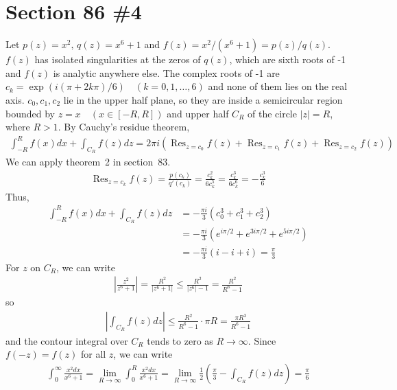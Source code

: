 \documentclass{scrartcl}
\DeclareMathOperator*{\Res}{Res}
\begin{document}
\section{Section 86 \#4}
Let \(p(z) = x^2,\, q(z) = x^6 + 1\) and \(f(z) = x^2 / (x^6 + 1) = p(z) / q(z)\).
\(f(z)\) has isolated singularities at the zeros of \(q(z)\), which are sixth roots of -1 and \(f(z)\) is analytic anywhere else.
The complex roots of -1 are \(c_k = \exp(i(\pi + 2k\pi) / 6) \quad (k = 0, 1, \dots, 6)\) and none of them lies on the real axis.
\(c_0, c_1, c_2\) lie in the upper half plane, so they are inside a semicircular region bounded by \(z = x \quad (x \in [-R, R])\) and upper half \(C_R\) of the circle \(|z| = R\), where \(R > 1\).
By Cauchy's residue theorem,
\begin{align*}
  \int^R_{-R} f(x) dx + \int_{C_R} f(z) dz
  = 2\pi i \left( \Res_{z = c_0} f(z) + \Res_{z = c_1} f(z) + \Res_{z = c_2} f(z) \right)
\end{align*}
We can apply theorem~2 in section~83.
\begin{align*}
  \Res_{z = c_k} f(z)
  = \frac{p(c_k)}{q'(c_k)}
  = \frac{c_k^2}{6c_k^5}
  = \frac{c_k^3}{6c_k^6}
  = -\frac{c_k^3}{6}
\end{align*}
Thus,
\begin{align*}
  \int^R_{-R} f(x) dx + \int_{C_R} f(z) dz
  &= -\frac{\pi i}{3} (c_0^3 + c_1^3 + c_2^3) \\
  &= -\frac{\pi i}{3} (e^{i\pi / 2} + e^{3i\pi / 2} + e^{5i\pi / 2}) \\
  &= -\frac{\pi i}{3} (i - i + i) = \frac{\pi}{3}
\end{align*}
For \(z\) on \(C_R\), we can write
\begin{align*}
  \left| \frac{z^2}{z^6 + 1} \right| = \frac{R^2}{|z^6 + 1|} \leq \frac{R^2}{|z^6| - 1} = \frac{R^2}{R^6 - 1}
\end{align*}
so
\begin{align*}
  \left| \int_{C_R} f(z) dz \right| \leq \frac{R^2}{R^6 - 1} \cdot \pi R = \frac{\pi R^3}{R^6 - 1}
\end{align*}
and the contour integral over \(C_R\) tends to zero as \(R \to \infty\).
Since \(f(-z) = f(z)\) for all \(z\), we can write
\begin{align*}
  \int^\infty_0 \frac{x^2 dx}{x^6 + 1}
  = \lim_{R \to \infty} \int^R_0 \frac{x^2 dx}{x^6 + 1}
  = \lim_{R \to \infty} \frac{1}{2} \left( \frac{\pi}{3} - \int_{C_R} f(z) dz \right)
  = \frac{\pi}{6}
\end{align*}
\end{document}
